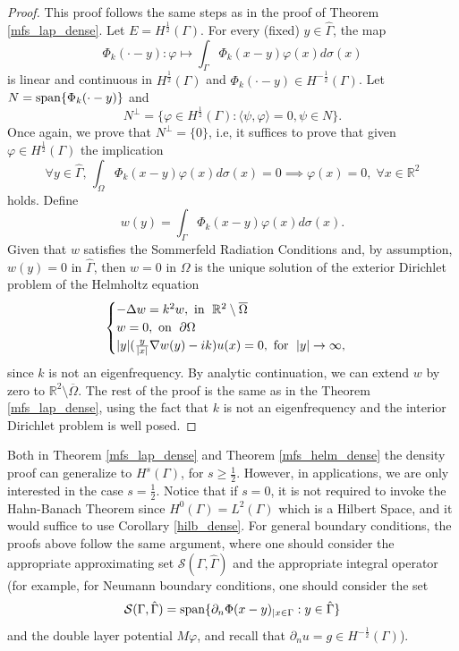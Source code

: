 \begin{proof}
    This proof follows the same steps as in the proof of Theorem \eqref{mfs_lap_dense}. Let \(E = H^\frac{1}{2}(\Gamma)\). For every (fixed) \(y \in \hat{\Gamma}\), the map
    \[
        \Phi_k(\cdot-y): \varphi \mapsto \int_\Gamma \Phi_k(x-y)\varphi(x)d\sigma(x)
    \]
    is linear and continuous in \(H^\frac{1}{2}(\Gamma)\) and \(\Phi_k(\cdot-y) \in H^{-\frac{1}{2}}(\Gamma)\). Let \(N = \operatorname{span}\{\Phi_k(\cdot-y)\}\) and
    \[
        N^\perp = \{\varphi \in H^\frac{1}{2}(\Gamma): \langle \psi, \varphi \rangle = 0, \psi \in N\}.
    \]
    Once again, we prove that \(N^\perp = \{0\}\), i.e, it suffices to prove that given \(\varphi \in H^\frac{1}{2}(\Gamma)\) the implication
    \[
        \forall y \in \hat{\Gamma}, \, \int_\Omega \Phi_k(x-y)\varphi(x)d\sigma(x) = 0 \implies \varphi(x) = 0, \; \forall x \in \mathbb{R}^2
    \]
    holds. Define
    \[
        w(y) = \int_\Gamma \Phi_k(x-y)\varphi(x)d\sigma(x).
    \]
    Given that \(w\) satisfies the Sommerfeld Radiation Conditions and, by assumption, \(w(y) = 0\) in \(\hat{\Gamma}\), then \(w = 0\) in \(\Omega\) is the unique solution of the exterior Dirichlet problem of the Helmholtz equation
    \[
        \begin{cases}
            -\Delta w = k^2 w, \text{ in } \; \mathbb{R}^2\setminus \overline{\Omega}\\
            w = 0, \text{ on } \; \partial \Omega\\
            \abs{y} (\frac{y}{\abs{x}}\nabla w(y) - i k)u(x) = 0, \text{ for } \; \abs{y} \rightarrow \infty,
        \end{cases}
    \]
    since \(k\) is not an eigenfrequency. By analytic continuation, we can extend \(w\) by zero to \(\mathbb{R}^2\setminus \overline{\Omega}\). The rest of the proof is the same as in the Theorem \eqref{mfs_lap_dense}, using the fact that \(k\) is not an eigenfrequency and the interior Dirichlet problem is well posed.
\end{proof}
\begin{remark}\label{density_remark_general_bc_and_hilbert}
    Both in Theorem \eqref{mfs_lap_dense} and Theorem \eqref{mfs_helm_dense} the density proof can generalize to \(H^s(\Gamma)\), for \(s \geq \frac{1}{2}\). However, in applications, we are only interested in the case \(s=\frac{1}{2}\). Notice that if \(s=0\), it is not required to invoke the Hahn-Banach Theorem since \(H^0(\Gamma)=L^2(\Gamma)\) which is a Hilbert Space, and it would suffice to use Corollary \eqref{hilb_dense}. For general boundary conditions, the proofs above follow the same argument, where one should consider the appropriate approximating set \(\mathcal{S}(\Gamma, \hat{\Gamma})\) and the appropriate integral operator (for example, for Neumann boundary conditions, one should consider the set
    \[
        \mathcal{S}(\Gamma, \hat{\Gamma}) = \operatorname{span}\{\partial_n \Phi(x-y)_{|x \in \Gamma} : y \in \hat{\Gamma}\}
    \]
    and the double layer potential \(M\varphi\), and recall that \(\partial_n u = g \in H^{-\frac{1}{2}}(\Gamma)\)).
\end{remark}
